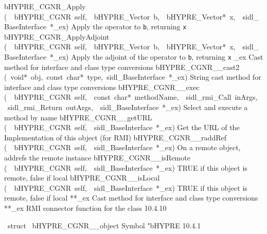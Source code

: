 \documentclass{article}
\begin{document}
\begin{cxxentry}
\begin{cxxentry}
\begin{cxxnames}
        {bHYPRE\_CGNR\_Apply}
        {(\ \ bHYPRE\_CGNR\ self,\ \ bHYPRE\_Vector\ b,\ \ bHYPRE\_Vector*\ x,\ \ sidl\_BaseInterface\ *\_ex)}
        {
Apply the operator to {\tt b}, returning {\tt x}}
        {}
\label{cxx.10.4.30}
        {bHYPRE\_CGNR\_ApplyAdjoint}
        {(\ \ bHYPRE\_CGNR\ self,\ \ bHYPRE\_Vector\ b,\ \ bHYPRE\_Vector*\ x,\ \ sidl\_BaseInterface\ *\_ex)}
        {
Apply the adjoint of the operator to {\tt b}, returning {\tt x}}
        {}
\label{cxx.10.4.31}
        {\_ex}
        {}
        {
Cast method for interface and class type conversions}
        {}
\label{cxx.10.4.32}
        {bHYPRE\_CGNR\_\_cast2}
        {(\ void*\ obj,\ const\ char*\ type,\ sidl\_BaseInterface\ *\_ex)}
        {
String cast method for interface and class type conversions}
        {}
\label{cxx.10.4.33}
        {bHYPRE\_CGNR\_\_exec}
        {(\ \ bHYPRE\_CGNR\ self,\ \ const\ char*\ methodName,\ \ sidl\_rmi\_Call\ inArgs,\ \ sidl\_rmi\_Return\ outArgs,\ \ sidl\_BaseInterface\ *\_ex)}
        {
Select and execute a method by name}
        {}
\label{cxx.10.4.34}
        {bHYPRE\_CGNR\_\_getURL}
        {(\ \ bHYPRE\_CGNR\ self,\ \ sidl\_BaseInterface\ *\_ex)}
        {
Get the URL of the Implementation of this object (for RMI)}
        {}
\label{cxx.10.4.35}
        {bHYPRE\_CGNR\_\_raddRef}
        {(\ \ bHYPRE\_CGNR\ self,\ \ sidl\_BaseInterface\ *\_ex)}
        {
On a remote object, addrefs the remote instance}
        {}
\label{cxx.10.4.36}
        {bHYPRE\_CGNR\_\_isRemote}
        {(\ \ bHYPRE\_CGNR\ self,\ \ sidl\_BaseInterface\ *\_ex)}
        {
TRUE if this object is remote, false if local}
        {}
\label{cxx.10.4.37}
        {bHYPRE\_CGNR\_\_isLocal}
        {(\ \ bHYPRE\_CGNR\ self,\ \ sidl\_BaseInterface\ *\_ex)}
        {
TRUE if this object is remote, false if local}
        {}
\label{cxx.10.4.38}
        {**\_ex}
        {}
        {
Cast method for interface and class type conversions}
        {}
\label{cxx.10.4.39}
        {**\_ex}
        {}
        {
RMI connector function for the class}
        {10.4.10}
\end{cxxnames}
\begin{cxxvariable}
{\ struct\ }
        {bHYPRE\_CGNR\_\_object}
        {}
        {
Symbol "bHYPRE}
        {10.4.1}
\begin{cxxdoc}


\end{cxxdoc}
\end{cxxvariable}
\end{cxxentry}
\end{cxxentry}
\end{document}
